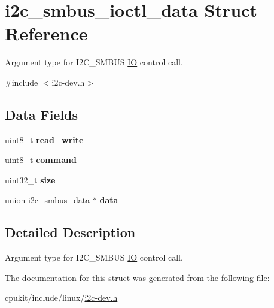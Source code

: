 \hypertarget{structi2c__smbus__ioctl__data}{}\section{i2c\+\_\+smbus\+\_\+ioctl\+\_\+data Struct Reference}
\label{structi2c__smbus__ioctl__data}


Argument type for I2\+C\+\_\+\+S\+M\+B\+US \mbox{\hyperlink{structIO}{IO}} control call.  




{\ttfamily \#include $<$i2c-\/dev.\+h$>$}

\subsection*{Data Fields}
\begin{DoxyCompactItemize}
\item 
\mbox{\label{structi2c__smbus__ioctl__data_a59685c3fa685a04e170b4ce21f9d30e4}} 
uint8\+\_\+t {\bfseries read\+\_\+write}
\item 
\mbox{\label{structi2c__smbus__ioctl__data_adaacbd70d47e01e8bca1457b721089e7}} 
uint8\+\_\+t {\bfseries command}
\item 
\mbox{\label{structi2c__smbus__ioctl__data_ad0bd4d497e020b483e9f00ba72d80e13}} 
uint32\+\_\+t {\bfseries size}
\item 
\mbox{\label{structi2c__smbus__ioctl__data_af5a53e4ed38f278bd5fb62a65b67432d}} 
union \mbox{\hyperlink{unioni2c__smbus__data}{i2c\+\_\+smbus\+\_\+data}} $\ast$ {\bfseries data}
\end{DoxyCompactItemize}


\subsection{Detailed Description}
Argument type for I2\+C\+\_\+\+S\+M\+B\+US \mbox{\hyperlink{structIO}{IO}} control call. 

The documentation for this struct was generated from the following file\+:\begin{DoxyCompactItemize}
\item 
cpukit/include/linux/\mbox{\hyperlink{i2c-dev_8h}{i2c-\/dev.\+h}}\end{DoxyCompactItemize}
